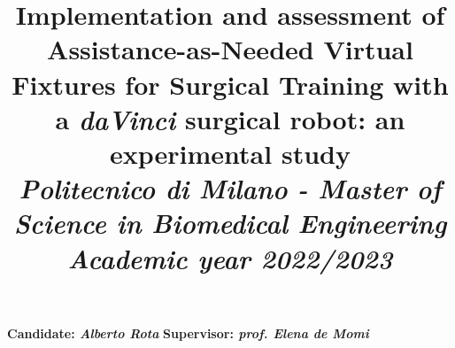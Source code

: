 \documentclass{article}
\title{\textbf{Implementation and assessment of Assistance-as-Needed Virtual Fixtures for Surgical Training with a \textit{daVinci} surgical robot: an experimental study}
\\
\vspace{0.5cm}\large{\textit{Politecnico di Milano - Master of Science in Biomedical Engineering}}
\\
\vspace{0.5cm}\textit{\small{Academic year 2022/2023}}}
\author{}
\date{}
\begin{document}
\maketitle
{\large\noindent \textbf{Candidate: \textit{Alberto Rota}}\newline
\textbf{Supervisor: \textit{prof. Elena de Momi}}}
\vspace{1cm}




% 
% 
\end{document}
